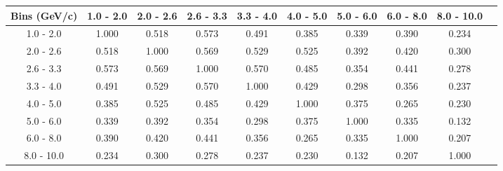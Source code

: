 \documentclass[aps, prd, reprint,showpacs,  preprintnumbers,amsmath,amssymb,superscriptaddress, nofootinbib]{revtex4-1}
\makeatletter
\renewenvironment{table}
  {\def\@captype{table}}
  {}
\makeatother
\begin{document}
\begin{table}
\centering
\begin{tabular}{cccccccccc}
\hline
  Bins (GeV/c) &    1.0 - 2.0 &    2.0 - 2.6 &    2.6 - 3.3 &   3.3 - 4.0 &    4.0 - 5.0 &  5.0 - 6.0 &  6.0 - 8.0 &  8.0 - 10.0 \\ 
\hline
  1.0 -   2.0  & 1.000  & 0.518  & 0.573  & 0.491  & 0.385  & 0.339  & 0.390  & 0.234 \\
  2.0 -   2.6  & 0.518  & 1.000  & 0.569  & 0.529  & 0.525  & 0.392  & 0.420  & 0.300 \\
  2.6 -   3.3  & 0.573  & 0.569  & 1.000  & 0.570  & 0.485  & 0.354  & 0.441  & 0.278 \\
  3.3 -   4.0  & 0.491  & 0.529  & 0.570  & 1.000  & 0.429  & 0.298  & 0.356  & 0.237 \\
  4.0 -   5.0  & 0.385  & 0.525  & 0.485  & 0.429  & 1.000  & 0.375  & 0.265  & 0.230 \\
  5.0 -   6.0  & 0.339  & 0.392  & 0.354  & 0.298  & 0.375  & 1.000  & 0.335  & 0.132 \\
  6.0 -   8.0  & 0.390  & 0.420  & 0.441  & 0.356  & 0.265  & 0.335  & 1.000  & 0.207 \\
  8.0 -  10.0  & 0.234  & 0.300  & 0.278  & 0.237  & 0.230  & 0.132  & 0.207  & 1.000 \\
\hline
\hline
\end{tabular}
\caption{Correlation matrix for bins of $d\sigma/dp_\mu$.}
\label{tb:piz_mup_cov}
\end{table}

\vspace{0.7cm}
\end{document}
